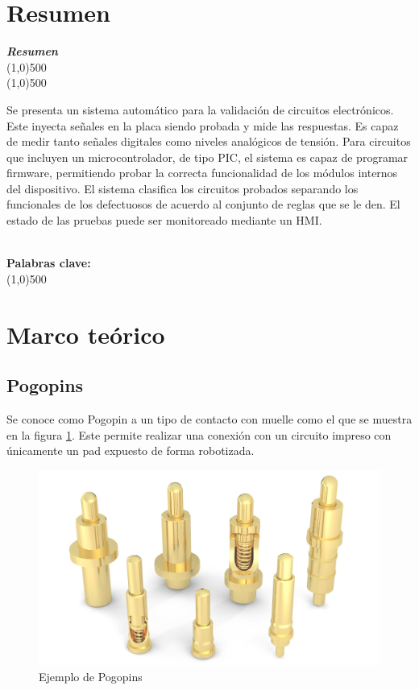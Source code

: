 \documentclass[12pt,letterpaper]{article}     %
\makeatletter
\newcounter{resumen}
\newenvironment{resumen}
{	
	\begin{center}
	\begin{minipage}[t]{500 pt}
	\vspace{5mm}
	\emph{\textbf{Resumen}}
	\\[-2mm]
	\line(1,0){500}
	\\[-4.25 mm]
	\line(1,0){500}
	\vspace{\baselineskip}
}
{
	\normalsize
	\\[2mm]
	\footnotesize\textbf{Palabras clave: \footnotesize\@palabras}
	\\[-2mm]
	\line(1,0){500}
	\\[0.5cm]
	\end{minipage}
	\end{center}
}
\makeatother
\begin{document}
\newpage
\section{Resumen}
\begin{resumen}
	Se presenta un sistema automático para la validación de circuitos electrónicos.
	Este inyecta señales en la placa siendo probada y mide las respuestas.
	Es capaz de medir tanto señales digitales como niveles analógicos de tensión.
	Para circuitos que incluyen un microcontrolador, de tipo PIC, el sistema es capaz de programar
	firmware, permitiendo probar la correcta funcionalidad de los módulos internos
	del dispositivo. El sistema clasifica los circuitos probados separando los
	funcionales de los defectuosos de acuerdo al conjunto de reglas que se le den.
	El estado de las pruebas puede ser monitoreado mediante un HMI.
\end{resumen} 
\clearpage
\section{Marco teórico}
\label{Marco teórico}

\subsection{Pogopins}

Se conoce como Pogopin a un tipo de contacto con muelle como el que se muestra en la figura \ref{fig:pogopin}.
Este permite realizar una conexión con un circuito impreso con únicamente un pad expuesto de forma robotizada.

\begin{figure}[!ht]
\centering
\includegraphics[]{imagenes/pogopin.jpg}
\caption{Ejemplo de Pogopins}
\label{fig:pogopin}
\end{figure}
\end{document}
